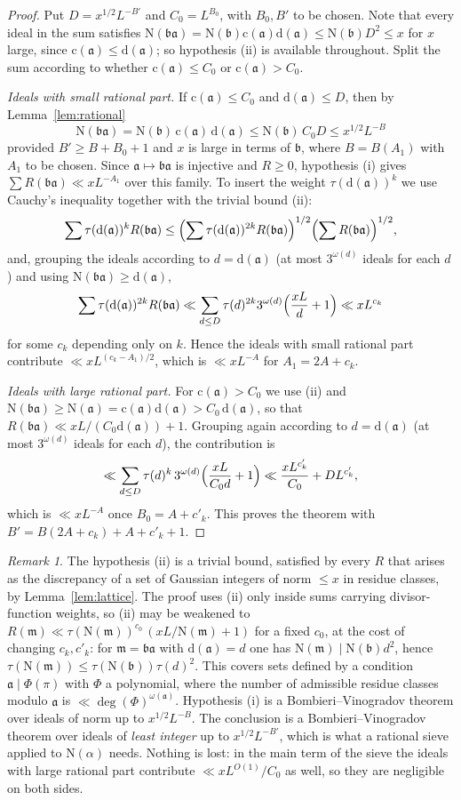 \documentclass[11pt]{amsart}
\theoremstyle{remark}
\newtheorem{remark}[theorem]{Remark}
\newcommand{\N}{\mathrm{N}}
\newcommand{\fa}{\mathfrak{a}}
\newcommand{\fb}{\mathfrak{b}}
\newcommand{\fm}{\mathfrak{m}}
\newcommand{\dd}{\mathrm{d}}
\newcommand{\cc}{\mathrm{c}}
\begin{document}
\begin{proof}
Put $D=x^{1/2}L^{-B'}$ and $C_0=L^{B_0}$, with $B_0,B'$ to be chosen. Note that every ideal in the sum satisfies $\N(\fb\fa)=\N(\fb)\cc(\fa)\dd(\fa)\le\N(\fb)D^2\le x$ for $x$ large, since $\cc(\fa)\le\dd(\fa)$; so hypothesis (ii) is available throughout. Split the sum according to whether $\cc(\fa)\le C_0$ or $\cc(\fa)>C_0$.

\emph{Ideals with small rational part.} If $\cc(\fa)\le C_0$ and $\dd(\fa)\le D$, then by Lemma~\ref{lem:rational}
\[
\N(\fb\fa)=\N(\fb)\,\cc(\fa)\,\dd(\fa)\le \N(\fb)\,C_0 D\le x^{1/2}L^{-B}
\]
provided $B'\ge B+B_0+1$ and $x$ is large in terms of $\fb$, where $B=B(A_1)$ with $A_1$ to be chosen. Since $\fa\mapsto\fb\fa$ is injective and $R\ge 0$, hypothesis (i) gives $\sum R(\fb\fa)\ll xL^{-A_1}$ over this family. To insert the weight $\tau(\dd(\fa))^k$ we use Cauchy's inequality together with the trivial bound (ii):
\[
\sum \tau(\dd(\fa))^{k}R(\fb\fa)\le\Bigl(\sum\tau(\dd(\fa))^{2k}R(\fb\fa)\Bigr)^{1/2}\Bigl(\sum R(\fb\fa)\Bigr)^{1/2},
\]
and, grouping the ideals according to $d=\dd(\fa)$ (at most $3^{\omega(d)}$ ideals for each $d$) and using $\N(\fb\fa)\ge\dd(\fa)$,
\[
\sum\tau(\dd(\fa))^{2k}R(\fb\fa)\ll\sum_{d\le D}\tau(d)^{2k}3^{\omega(d)}\Bigl(\frac{xL}{d}+1\Bigr)\ll x L^{c_k}
\]
for some $c_k$ depending only on $k$. Hence the ideals with small rational part contribute $\ll x L^{(c_k-A_1)/2}$, which is $\ll xL^{-A}$ for $A_1=2A+c_k$.

\emph{Ideals with large rational part.} For $\cc(\fa)>C_0$ we use (ii) and $\N(\fb\fa)\ge\N(\fa)=\cc(\fa)\dd(\fa)>C_0\,\dd(\fa)$, so that $R(\fb\fa)\ll xL/(C_0\dd(\fa))+1$. Grouping again according to $d=\dd(\fa)$ (at most $3^{\omega(d)}$ ideals for each $d$), the contribution is
\[
\ll\sum_{d\le D}\tau(d)^k\,3^{\omega(d)}\Bigl(\frac{xL}{C_0d}+1\Bigr)
\ll \frac{x L^{c'_k}}{C_0}+D L^{c'_k},
\]
which is $\ll xL^{-A}$ once $B_0=A+c'_k$. This proves the theorem with $B'=B(2A+c_k)+A+c'_k+1$.
\end{proof}

\begin{remark}\label{rem:weak}
The hypothesis (ii) is a trivial bound, satisfied by every $R$ that arises as the discrepancy of a set of Gaussian integers of norm $\le x$ in residue classes, by Lemma~\ref{lem:lattice}. The proof uses (ii) only inside sums carrying divisor-function weights, so (ii) may be weakened to $R(\fm)\ll\tau(\N(\fm))^{c_0}\,(xL/\N(\fm)+1)$ for a fixed $c_0$, at the cost of changing $c_k, c'_k$: for $\fm=\fb\fa$ with $\dd(\fa)=d$ one has $\N(\fm)\mid \N(\fb)d^2$, hence $\tau(\N(\fm))\le\tau(\N(\fb))\tau(d)^2$. This covers sets defined by a condition $\fa\mid\Phi(\pi)$ with $\Phi$ a polynomial, where the number of admissible residue classes modulo $\fa$ is $\ll\deg(\Phi)^{\omega(\fa)}$. Hypothesis (i) is a Bombieri--Vinogradov theorem over ideals of norm up to $x^{1/2}L^{-B}$. The conclusion is a Bombieri--Vinogradov theorem over ideals of \emph{least integer} up to $x^{1/2}L^{-B'}$, which is what a rational sieve applied to $\N(\alpha)$ needs. Nothing is lost: in the main term of the sieve the ideals with large rational part contribute $\ll xL^{O(1)}/C_0$ as well, so they are negligible on both sides.
\end{remark}
\end{document}
